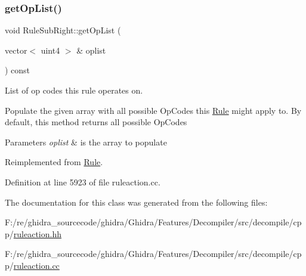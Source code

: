 \subsubsection{\texorpdfstring{getOpList()}{getOpList()}}
{\footnotesize\ttfamily void Rule\+Sub\+Right\+::get\+Op\+List (\begin{DoxyParamCaption}\item[{vector$<$ uint4 $>$ \&}]{oplist }\end{DoxyParamCaption}) const\hspace{0.3cm}{\ttfamily [virtual]}}



List of op codes this rule operates on. 

Populate the given array with all possible Op\+Codes this \mbox{\hyperlink{class_rule}{Rule}} might apply to. By default, this method returns all possible Op\+Codes 
\begin{DoxyParams}{Parameters}
{\em oplist} & is the array to populate \\
\hline
\end{DoxyParams}


Reimplemented from \mbox{\hyperlink{class_rule_a4023bfc7825de0ab866790551856d10e}{Rule}}.



Definition at line 5923 of file ruleaction.\+cc.



The documentation for this class was generated from the following files\+:\begin{DoxyCompactItemize}
\item 
F\+:/re/ghidra\+\_\+sourcecode/ghidra/\+Ghidra/\+Features/\+Decompiler/src/decompile/cpp/\mbox{\hyperlink{ruleaction_8hh}{ruleaction.\+hh}}\item 
F\+:/re/ghidra\+\_\+sourcecode/ghidra/\+Ghidra/\+Features/\+Decompiler/src/decompile/cpp/\mbox{\hyperlink{ruleaction_8cc}{ruleaction.\+cc}}\end{DoxyCompactItemize}

